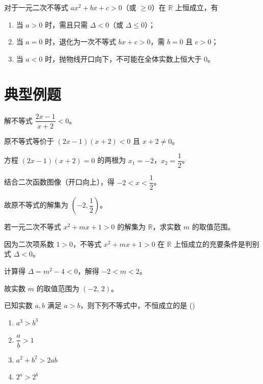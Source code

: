 \documentclass[11pt]{ctexrep}
\begin{document}
\begin{property}[一元二次不等式恒成立的条件]
对于一元二次不等式 $ax^2+bx+c>0$（或 $\geq 0$）在 $\mathbb{R}$ 上恒成立，有
\begin{enumerate}[label=(\arabic*)]
    \item 当 $a>0$ 时，需且只需 $\Delta<0$（或 $\Delta\leq 0$）；
    \item 当 $a=0$ 时，退化为一次不等式 $bx+c>0$，需 $b=0$ 且 $c>0$；
    \item 当 $a<0$ 时，抛物线开口向下，不可能在全体实数上恒大于 $0$。
\end{enumerate}
\end{property}

\section*{典型例题}

\begin{example}[分式不等式的求解]
解不等式 $\dfrac{2x-1}{x+2}<0$。
\end{example}

\begin{solution}
原不等式等价于 $(2x-1)(x+2)<0$ 且 $x+2\neq 0$。

方程 $(2x-1)(x+2)=0$ 的两根为 $x_1=-2$，$x_2=\dfrac{1}{2}$。

结合二次函数图像（开口向上），得 $-2<x<\dfrac{1}{2}$。

故原不等式的解集为 $\boxed{\left(-2,\dfrac{1}{2}\right)}$。
\end{solution}

\begin{example}[含参数的一元二次不等式恒成立问题]
若一元二次不等式 $x^2+mx+1>0$ 的解集为 $\mathbb{R}$，求实数 $m$ 的取值范围。
\end{example}

\begin{solution}
因为二次项系数 $1>0$，不等式 $x^2+mx+1>0$ 在 $\mathbb{R}$ 上恒成立的充要条件是判别式 $\Delta<0$。

计算得 $\Delta=m^2-4<0$，解得 $-2<m<2$。

故实数 $m$ 的取值范围为 $\boxed{(-2,\,2)}$。
\end{solution}

\begin{realexam}[2025 高三二模嘉定]
已知实数 $a, b$ 满足 $a > b$，则下列不等式中，不恒成立的是 \hfill (\quad)
\begin{enumerate}[label=\Alph*.,leftmargin=2em]
    \item $a^3 > b^3$
    \item $\dfrac{a}{b} > 1$
    \item $a^2 + b^2 > 2ab$
    \item $2^a > 2^b$
\end{enumerate}
\end{realexam}
\end{document}
